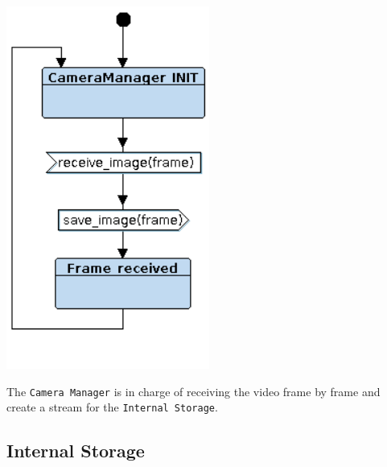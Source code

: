 \documentclass{article}
\begin{document}
\begin{minipage}{\linewidth}
  \centering
  \begin{minipage}{0.6\linewidth}
    \centering
    \includegraphics[width = 0.5\textwidth]{Foscam08.png}
  \end{minipage}
  \begin{minipage}{0.35\linewidth}
    The \texttt{Camera Manager} is in charge of receiving the video frame by frame
    and create a stream for the \texttt{Internal Storage}.
  \end{minipage}
\end{minipage}

\subsection{Internal Storage}
\label{sec:Internal Storage}
\end{document}
